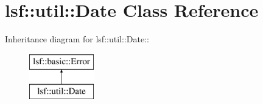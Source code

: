\hypertarget{classlsf_1_1util_1_1Date}{
\section{lsf::util::Date Class Reference}
\label{classlsf_1_1util_1_1Date}
}
Inheritance diagram for lsf::util::Date::\begin{figure}[H]
\begin{center}
\leavevmode
\includegraphics[height=2cm]{classlsf_1_1util_1_1Date}
\end{center}
\end{figure}
